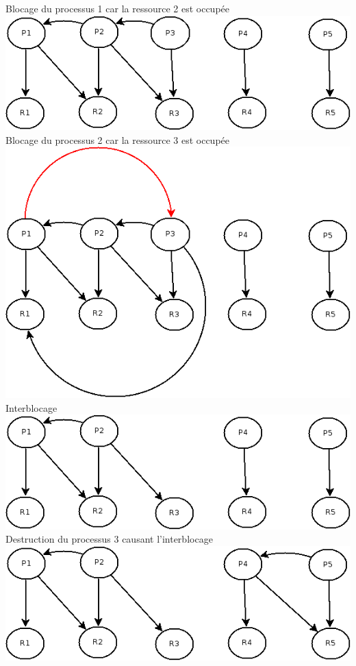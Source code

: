 \documentclass{article}
\begin{document}
Blocage du processus 1 car la ressource 2 est occupée\\
\includegraphics[scale=0.5]{images/test6}\\
Blocage du processus 2 car la ressource 3 est occupée\\
\includegraphics[scale=0.5]{images/test7}\\
Interblocage\\
\includegraphics[scale=0.5]{images/test8}\\
Destruction du processus 3 causant l'interblocage\\
\includegraphics[scale=0.5]{images/test9}\\
\end{document}
